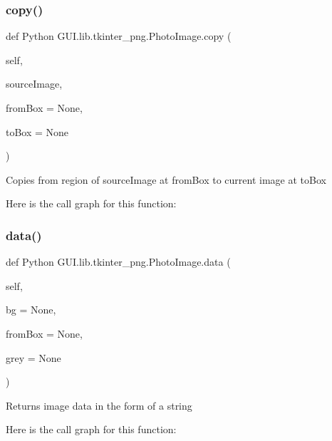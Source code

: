 \subsubsection{\texorpdfstring{copy()}{copy()}}
{\footnotesize\ttfamily def Python G\+U\+I.\+lib.\+tkinter\+\_\+png.\+Photo\+Image.\+copy (\begin{DoxyParamCaption}\item[{}]{self,  }\item[{}]{source\+Image,  }\item[{}]{from\+Box = {\ttfamily None},  }\item[{}]{to\+Box = {\ttfamily None} }\end{DoxyParamCaption})}

\begin{DoxyVerb}Copies from region of sourceImage at fromBox to current image at toBox\end{DoxyVerb}
 Here is the call graph for this function\+:
\mbox{\label{class_python_01_g_u_i_1_1lib_1_1tkinter__png_1_1_photo_image_a9dc5998b9c861f2e04f5e4cf4c7c7c84}} 
\subsubsection{\texorpdfstring{data()}{data()}}
{\footnotesize\ttfamily def Python G\+U\+I.\+lib.\+tkinter\+\_\+png.\+Photo\+Image.\+data (\begin{DoxyParamCaption}\item[{}]{self,  }\item[{}]{bg = {\ttfamily None},  }\item[{}]{from\+Box = {\ttfamily None},  }\item[{}]{grey = {\ttfamily None} }\end{DoxyParamCaption})}

\begin{DoxyVerb}Returns image data in the form of a string\end{DoxyVerb}
 Here is the call graph for this function\+:
\mbox{\label{class_python_01_g_u_i_1_1lib_1_1tkinter__png_1_1_photo_image_a339c767de9d64721537c33d7e56f7779}} 
